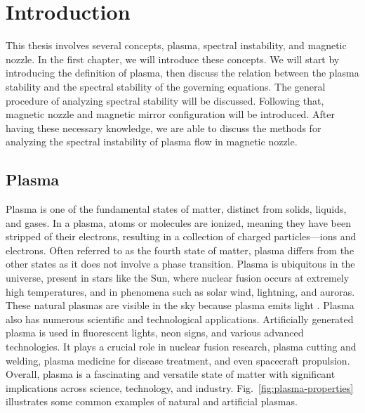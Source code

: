 \chapter{Introduction}
This thesis involves several concepts, plasma, spectral instability, and magnetic nozzle. In the first chapter, we will introduce these concepts. We will start by introducing the definition of plasma, then discuss the relation between the plasma stability and the spectral stability of the governing equations. The general procedure of analyzing spectral stability will be discussed. Following that, magnetic nozzle and magnetic mirror configuration will be introduced. After having these necessary knowledge, we are able to discuss the methods for analyzing the spectral instability of plasma flow in magnetic nozzle.

\section{Plasma}
Plasma is one of the fundamental states of matter, distinct from solids, liquids, and gases. In a plasma, atoms or molecules are ionized, meaning they have been stripped of their electrons, resulting in a collection of charged particles—ions and electrons. Often referred to as the fourth state of matter, plasma differs from the other states as it does not involve a phase transition. Plasma is ubiquitous in the universe, present in stars like the Sun, where nuclear fusion occurs at extremely high temperatures, and in phenomena such as solar wind, lightning, and auroras. These natural plasmas are visible in the sky because plasma emits light \cite{chen_introduction_2016}. Plasma also has numerous scientific and technological applications. Artificially generated plasma is used in fluorescent lights, neon signs, and various advanced technologies. It plays a crucial role in nuclear fusion research, plasma cutting and welding, plasma medicine for disease treatment, and even spacecraft propulsion. Overall, plasma is a fascinating and versatile state of matter with significant implications across science, technology, and industry. Fig.~\ref{fig:plasma-properties} illustrates some common examples of natural and artificial plasmas.

